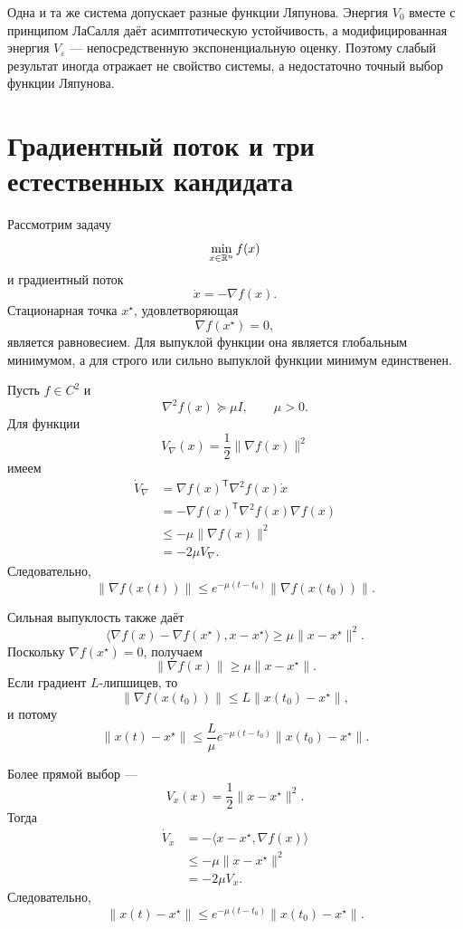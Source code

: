 Одна и та же система допускает разные функции Ляпунова. Энергия
\(V_0\) вместе с принципом ЛаСалля даёт асимптотическую устойчивость,
а модифицированная энергия \(V_\varepsilon\) --- непосредственную
экспоненциальную оценку. Поэтому слабый результат иногда отражает не
свойство системы, а недостаточно точный выбор функции Ляпунова.

\section{Градиентный поток и три естественных кандидата}

Рассмотрим задачу
\[
    \min_{x\in\mathbb{R}^n}f(x)
\]
и градиентный поток
\[
    \dot x=-\nabla f(x).
\]
Стационарная точка \(x^\star\), удовлетворяющая
\[
    \nabla f(x^\star)=0,
\]
является равновесием. Для выпуклой функции она является глобальным
минимумом, а для строго или сильно выпуклой функции минимум
единственен.

Пусть \(f\in C^2\) и
\[
    \nabla^2f(x)\succeq\mu I,
    \qquad
    \mu>0.
\]
Для функции
\[
    V_\nabla(x)
    =
    \frac12\lVert\nabla f(x)\rVert^2
\]
имеем
\[
\begin{aligned}
    \dot V_\nabla
    &=
    \nabla f(x)^{\mathsf T}\nabla^2f(x)\dot x
    \\
    &=
    -\nabla f(x)^{\mathsf T}
    \nabla^2f(x)\nabla f(x)
    \\
    &\le
    -\mu\lVert\nabla f(x)\rVert^2
    \\
    &=
    -2\mu V_\nabla.
\end{aligned}
\]
Следовательно,
\[
    \lVert\nabla f(x(t))\rVert
    \le
    e^{-\mu(t-t_0)}
    \lVert\nabla f(x(t_0))\rVert.
\]

Сильная выпуклость также даёт
\[
    \langle
        \nabla f(x)-\nabla f(x^\star),
        x-x^\star
    \rangle
    \ge
    \mu\lVert x-x^\star\rVert^2.
\]
Поскольку \(\nabla f(x^\star)=0\), получаем
\[
    \lVert\nabla f(x)\rVert
    \ge
    \mu\lVert x-x^\star\rVert.
\]
Если градиент \(L\)-липшицев, то
\[
    \lVert\nabla f(x(t_0))\rVert
    \le
    L\lVert x(t_0)-x^\star\rVert,
\]
и потому
\[
    \lVert x(t)-x^\star\rVert
    \le
    \frac{L}{\mu}
    e^{-\mu(t-t_0)}
    \lVert x(t_0)-x^\star\rVert.
\]

Более прямой выбор ---
\[
    V_x(x)
    =
    \frac12\lVert x-x^\star\rVert^2.
\]
Тогда
\[
\begin{aligned}
    \dot V_x
    &=
    -\langle x-x^\star,\nabla f(x)\rangle
    \\
    &\le
    -\mu\lVert x-x^\star\rVert^2
    \\
    &=
    -2\mu V_x.
\end{aligned}
\]
Следовательно,
\[
    \lVert x(t)-x^\star\rVert
    \le
    e^{-\mu(t-t_0)}
    \lVert x(t_0)-x^\star\rVert.
\]

